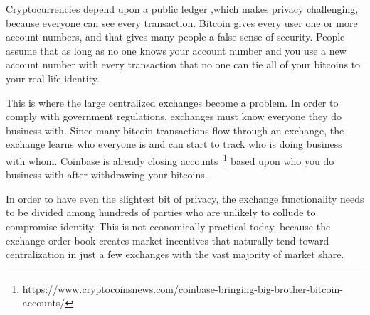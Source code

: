 Cryptocurrencies depend upon a public ledger ,which makes privacy challenging,
because everyone can see every transaction. Bitcoin gives every user one or
more account numbers, and that gives many people a false sense of security.
People assume that as long as no one knows your account number and you use a
new account number with every transaction that no one can tie all of your
bitcoins to your real life identity.

This is where the large centralized exchanges become a problem. In order to
comply with government regulations, exchanges must know everyone they do
business with. Since many bitcoin transactions flow through an exchange, the
exchange learns who everyone is and can start to track who is doing business
with whom. Coinbase is already closing
accounts~\footnote{https://www.cryptocoinsnews.com/coinbase-bringing-big-brother-bitcoin-accounts/}
based upon who you do business with after withdrawing your bitcoins.

In order to have even the slightest bit of privacy, the exchange functionality
needs to be divided among hundreds of parties who are unlikely to collude to
compromise identity. This is not economically practical today, because the
exchange order book creates market incentives that naturally tend toward
centralization in just a few exchanges with the vast majority of market share.
